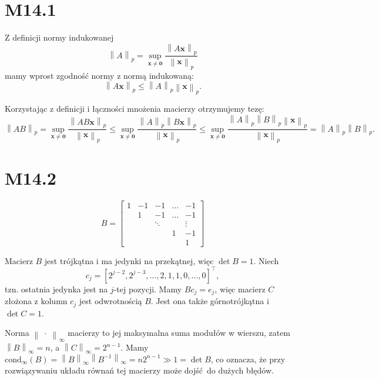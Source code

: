 \documentclass[a4paper, 12pt]{article}
\title{}
\author{Wiktor Kuchta}
\date{\vspace{-4ex}}
\newcommand{\norm}[1]{\left\lVert #1 \right\rVert}
\newcommand{\+}{\enspace}
\begin{document}
\maketitle

\section*{M14.1}
Z definicji normy indukowanej
$$
\norm{A}_p =
\sup_{\mathbf{x} ≠ \mathbf{0}}
    \frac{\norm{A\mathbf{x}}_p}{\norm{\mathbf{x}}_p}
$$
mamy wprost zgodność normy z normą indukowaną:
$$\norm{A\mathbf{x}}_p ≤ \norm{A}_p \norm{\mathbf{x}}_p.$$

Korzystając z definicji i łączności mnożenia macierzy otrzymujemy tezę:
$$
\norm{AB}_p
= \sup_{\mathbf{x} ≠ \mathbf{0}}
    \frac{\norm{AB\mathbf{x}}_p}{\norm{\mathbf{x}}_p}
≤ \sup_{\mathbf{x} ≠ \mathbf{0}}
\frac{\norm{A}_p\norm{B\mathbf{x}}_p}{\norm{\mathbf{x}}_p}
≤ \sup_{\mathbf{x} ≠ \mathbf{0}}
\frac{\norm{A}_p\norm{B}_p\norm{\mathbf{x}}_p}{\norm{\mathbf{x}}_p}
= \norm{A}_p\norm{B}_p.
$$

\section*{M14.2}
$$
B=
\begin{bmatrix}
	1 & -1 & -1 & … & -1 \\
	  &  1 & -1 & … & -1 \\
	  & & \ddots&&\vdots \\
	  &    &    &  1&  -1 \\
	  &    &    &   &  1
\end{bmatrix}
$$

Macierz $B$ jest trójkątna i ma jedynki na przekątnej,
więc $\det B = 1$.
Niech
$$c_j = [
	2^{j-2} ,
	2^{j-3} ,
	\dots  ,
	2       ,
	1       ,
	1       ,
	0       ,
	\dots  ,
	0
	]^⊤,
$$
tzn. ostatnia jedynka jest na $j$-tej pozycji.
Mamy $B c_j = e_j$,
więc macierz $C$ złożona z kolumn $c_j$ jest odwrotnością $B$.
Jest ona także górnotrójkątna i $\det C = 1$.

Norma $\norm{\;·\;}_∞$ macierzy to jej maksymalna suma modułów w wierszu,
zatem $\norm{B}_∞ = n$, a $\norm{C}_∞ = 2^{n-1}$.
Mamy $\mathrm{cond}_∞(B) = \norm{B}_∞\norm{B^{-1}}_∞ = n 2^{n-1} ≫ 1 = \det B$,
co oznacza,
że przy rozwiązywaniu układu równań tej macierzy może dojść do dużych błędów.
\end{document}
